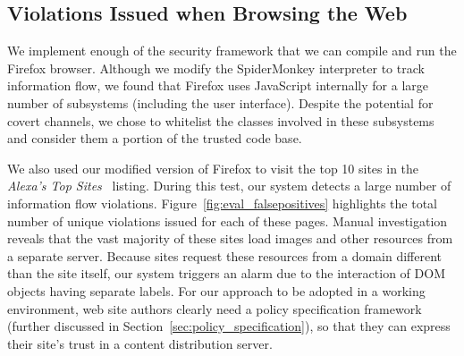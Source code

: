 \subsection{Violations Issued when Browsing the Web}
We implement enough of the security framework that we can compile and run the Firefox browser.
Although we modify the SpiderMonkey interpreter to track information flow, we found that Firefox uses JavaScript internally for a large number of subsystems (including the user interface).
Despite the potential for covert channels, we chose to whitelist the classes involved in these subsystems and consider them a portion of the trusted code base.


We also used our modified version of Firefox to visit the top 10 sites in the \textit{Alexa's Top Sites}~\cite{alexa} listing.
During this test, our system detects a large number of information flow violations.
Figure~\ref{fig:eval_falsepositives} highlights the total number of unique violations issued for each of these pages.
Manual investigation reveals that the vast majority of these sites load images and other resources from a separate server.
Because sites request these resources from a domain different than the site itself, our system triggers an alarm due to the interaction of DOM objects having separate labels.
For our approach to be adopted in a working environment, web site authors clearly need a policy specification framework (further discussed in Section~\ref{sec:policy_specification}), so that they can express their site's trust in a content distribution server.

\begin{comment}
\begin{figure}[htp]
  \centerline{\texttt{[image: graphics/evaluation\_falsepositives.pdf]}}
  \caption{Information flow alarms triggered when browsing Alexa's Top Sites in the United States~\cite{alexa}.}
  \label{fig:eval_falsepositives}
\end{figure}
\end{comment}





